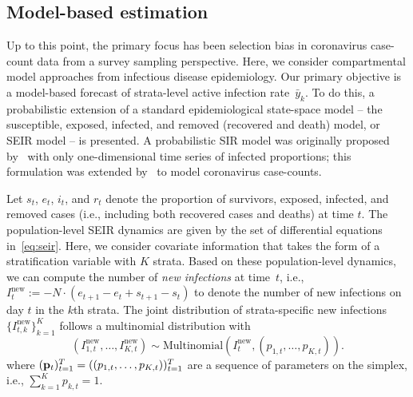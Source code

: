 \documentclass[11pt]{amsart}
\numberwithin{equation}{section}
\theoremstyle{plain}
\def\new{\text{new}}
\begin{document}
 \subsection{Model-based estimation}
 \label{section:modelbased}

 Up to this point, the primary focus has been selection bias in coronavirus case-count data from a survey sampling perspective.  Here, we consider compartmental model approaches from infectious disease epidemiology.  Our primary objective is a model-based forecast of strata-level active infection rate~$\bar y_k$. To do this, a probabilistic extension of a standard epidemiological state-space model -- the susceptible, exposed, infected, and removed (recovered and death) model, or SEIR model -- is presented. A probabilistic SIR model was originally proposed by~\cite{Osthus2017} with only one-dimensional time series of infected proportions; this formulation was extended by~\cite{Song2020} to model coronavirus case-counts.

 Let $s_t$, $e_t$, $i_t$, and $r_t$ denote the proportion of survivors, exposed, infected, and removed cases (i.e., including both recovered cases and deaths) at time $t$.  The population-level SEIR dynamics are given by the set of differential equations in~\eqref{eq:seir}.
Here, we consider covariate information that takes the form of a stratification variable with $K$ strata.  Based on these population-level dynamics, we can compute the number of \emph{new infections} at time~$t$, i.e., $I^\new_{t} := - N \cdot (e_{t+1} - e_{t} + s_{t+1} - s_t)$ to denote the number of new infections on day $t$ in the $k$th strata.  The joint distribution of strata-specific new infections~$ \{ I^{\new}_{t,k} \}_{k=1}^K$ follows a multinomial distribution with
 $$
 ( I^\new_{1,t}, \ldots, I^\new_{K,t} ) \sim \text{Multinomial} \left( I^\new_t, (p_{1,t}, \ldots, p_{K, t}) \right).
 $$
 where $( {\bf p}_t )_{t=1}^T = ( (p_{1,t}, \ldots, p_{K, t}) )_{t=1}^T$ are a sequence of parameters on the simplex, i.e., $\sum_{k=1}^K p_{k,t} = 1$.
\end{document}
